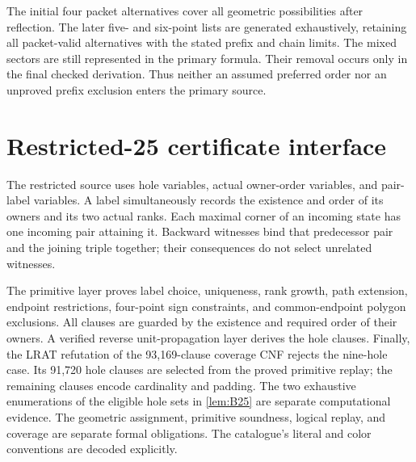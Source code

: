 The initial four packet alternatives cover all geometric possibilities
after reflection. The later five- and six-point lists are generated
exhaustively, retaining all packet-valid alternatives with the stated
prefix and chain limits. The mixed sectors are still represented in
the primary formula. Their removal occurs only in the final checked
derivation. Thus neither an assumed preferred order nor an unproved
prefix exclusion enters the primary source.


\section{Restricted-25 certificate interface}\label{app:restricted}
The restricted source uses hole variables, actual owner-order variables,
and pair-label variables. A label simultaneously records the existence
and order of its owners and its two actual ranks. Each maximal corner
of an incoming state has one incoming pair attaining it. Backward
witnesses bind that predecessor pair and the joining triple together;
their consequences do not select unrelated witnesses.

The primitive layer proves label choice, uniqueness, rank growth,
path extension, endpoint restrictions, four-point sign constraints,
and common-endpoint polygon exclusions. All clauses are guarded by
the existence and required order of their owners. A verified reverse
unit-propagation layer derives the hole clauses. Finally, the LRAT refutation of the 93,169-clause coverage CNF rejects
the nine-hole case. Its 91,720 hole clauses are selected from the
proved primitive replay; the remaining clauses encode cardinality
and padding. The two exhaustive enumerations of the eligible hole
sets in \cref{lem:B25} are separate computational evidence. The geometric assignment, primitive soundness,
logical replay, and coverage are separate formal obligations.
The catalogue's literal and color conventions are decoded explicitly.


